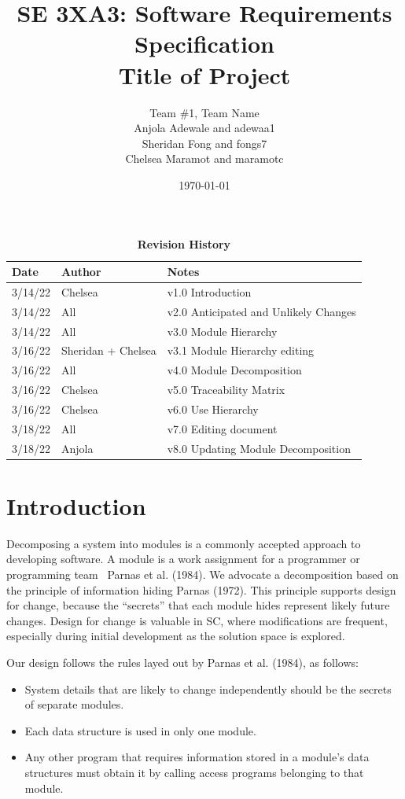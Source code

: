 \documentclass[12pt, titlepage]{article}
\title{SE 3XA3: Software Requirements Specification\\Title of Project}
\author{Team \#1, Team Name
		\\ Anjola Adewale and adewaa1
		\\ Sheridan Fong and fongs7
		\\ Chelsea Maramot and maramotc
}
\date{\today}
\begin{document}
\maketitle

\tableofcontents
\listoftables
\listoffigures

\begin{table}[H]
\caption{\bf Revision History}
\begin{tabularx}{\textwidth}{p{3cm}p{2cm}X}
\toprule {\bf Date} & {\bf Author} & {\bf Notes}\\
\midrule
3/14/22 & Chelsea & v1.0 Introduction \\

3/14/22 & All & v2.0 Anticipated and Unlikely Changes \\
3/14/22 & All & v3.0 Module Hierarchy \\
3/16/22 & Sheridan + Chelsea & v3.1 Module Hierarchy editing \\
3/16/22 & All & v4.0 Module Decomposition \\
3/16/22 & Chelsea & v5.0 Traceability Matrix \\
3/16/22 & Chelsea & v6.0 Use Hierarchy \\
3/18/22 & All & v7.0 Editing document \\
3/18/22 & Anjola & v8.0 Updating Module Decomposition \\
\bottomrule
\end{tabularx}
\end{table}

\newpage


\section{Introduction}

Decomposing a system into modules is a commonly accepted approach to developing
software.  A module is a work assignment for a programmer or programming
team~ Parnas et al. (1984).  We advocate a decomposition
based on the principle of information hiding Parnas (1972).  This
principle supports design for change, because the ``secrets'' that each module
hides represent likely future changes.  Design for change is valuable in SC,
where modifications are frequent, especially during initial development as the
solution space is explored.  

Our design follows the rules layed out by Parnas et al. (1984), as follows:
\begin{itemize}
\item System details that are likely to change independently should be the
  secrets of separate modules.
\item Each data structure is used in only one module.
\item Any other program that requires information stored in a module's data
  structures must obtain it by calling access programs belonging to that module.
\end{itemize}
\end{document}
